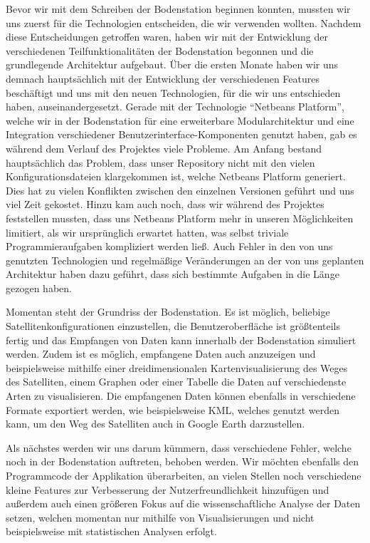 Bevor wir mit dem Schreiben der Bodenstation beginnen konnten, mussten wir uns zuerst für die Technologien entscheiden, die wir verwenden wollten. Nachdem diese Entscheidungen getroffen waren, haben wir mit der Entwicklung der verschiedenen Teilfunktionalitäten der Bodenstation begonnen und die grundlegende Architektur aufgebaut. Über die ersten Monate haben wir uns demnach hauptsächlich mit der Entwicklung der verschiedenen Features beschäftigt und uns mit den neuen Technologien, für die wir uns entschieden haben, auseinandergesetzt. Gerade mit der Technologie ``Netbeans Platform'', welche wir in der Bodenstation für eine erweiterbare Modularchitektur und eine Integration verschiedener Benutzerinterface-Komponenten genutzt haben, gab es während dem Verlauf des Projektes viele Probleme. Am Anfang bestand hauptsächlich das Problem, dass unser Repository nicht mit den vielen Konfigurationsdateien klargekommen ist, welche Netbeans Platform generiert. Dies hat zu vielen Konflikten zwischen den einzelnen Versionen geführt und uns viel Zeit gekostet. Hinzu kam auch noch, dass wir während des Projektes feststellen mussten, dass uns Netbeans Platform mehr in unseren Möglichkeiten limitiert, als wir ursprünglich erwartet hatten, was selbst triviale Programmieraufgaben kompliziert werden ließ. Auch Fehler in den von uns genutzten Technologien und regelmäßige Veränderungen an der von uns geplanten Architektur haben dazu geführt, dass sich bestimmte Aufgaben in die Länge gezogen haben.

Momentan steht der Grundriss der Bodenstation. Es ist möglich, beliebige Satellitenkonfigurationen einzustellen, die Benutzeroberfläche ist größtenteils fertig und das Empfangen von Daten kann innerhalb der Bodenstation simuliert werden. Zudem ist es möglich, empfangene Daten auch anzuzeigen und beispielsweise mithilfe einer dreidimensionalen Kartenvisualisierung des Weges des Satelliten, einem Graphen oder einer Tabelle die Daten auf verschiedenste Arten zu visualisieren. Die empfangenen Daten können ebenfalls in verschiedene Formate exportiert werden, wie beispielsweise KML, welches genutzt werden kann, um den Weg des Satelliten auch in Google Earth darzustellen.

Als nächstes werden wir uns darum kümmern, dass verschiedene Fehler, welche noch in der Bodenstation auftreten, behoben werden. Wir möchten ebenfalls den Programmcode der Applikation überarbeiten, an vielen Stellen noch verschiedene kleine Features zur Verbesserung der Nutzerfreundlichkeit hinzufügen und außerdem auch einen größeren Fokus auf die wissenschaftliche Analyse der Daten setzen, welchen momentan nur mithilfe von Visualisierungen und nicht beispielsweise mit statistischen Analysen erfolgt.


